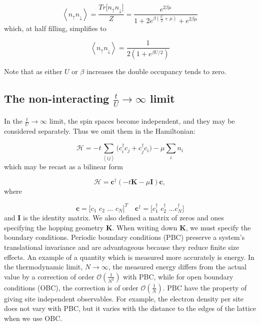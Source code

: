 \documentclass[10pt, twocolumn, twoside]{article}
\begin{document}
\begin{enumerate}
\begin{equation}
\left\langle n_\uparrow n_\downarrow \right\rangle = \frac{Tr \big[ n_\uparrow n_\downarrow \big]}{Z} = \frac{e^{2\beta\mu}}{1 + 2 e^{\beta (\frac{U}{2} + \mu )} + e^{2\beta\mu}}
\end{equation}
which, at half filling, simplifies to

\begin{equation}
\left\langle n_\uparrow n_\downarrow \right\rangle = \frac{1}{2 ( 1 + e^{\beta U/2} )}
\end{equation}

Note that as either $U$ or $\beta$ increases the double occupancy tends to zero.
\end{enumerate}

\subsection{The non-interacting $\frac{t}{U} \rightarrow \infty$ limit}\paragraph{}

In the $\frac{t}{U} \rightarrow \infty$ limit, the spin spaces become independent, and they may be considered separately. Thus we omit them in the Hamiltonian:

\begin{equation}
\mathcal{H} = -t \sum_{\left\langle i j \right\rangle} \big( c_i^\dagger c_j + c_j^\dagger c_i \big) - \mu \sum_i n_i
\end{equation}
which may be recast as a bilinear form

\begin{equation}
\mathcal{H} = \bm c^\dagger ( -t \bm K - \mu \bm I ) \bm c ,
\end{equation}
where

\begin{equation}
\bm c = \bigg[ c_1 \,\, c_2 \,\, ... \,\, c_N \bigg]^T \quad \bm c^\dagger = \bigg[c_1^\dagger \,\, c_2^\dagger \,\, ... c_N^\dagger \bigg]
\end{equation}
and $\bm I$ is the identity matrix. We also defined a matrix of zeros and ones specifying the hopping geometry $\bm K$. When writing down $\bm K$, we must specify the boundary conditions. Periodic boundary conditions (PBC) preserve a system's translational invariance and are advantageous because they reduce finite size effects. An example of a quantity which is measured more accurately is energy. In the thermodynamic limit, $N \rightarrow \infty$, the measured energy differs from the actual value by a correction of order $\mathcal{O}(\frac{1}{N^2})$ with PBC, while for open boundary conditions (OBC), the correction is of order $\mathcal{O}(\frac{1}{N})$. PBC have the property of giving site independent observables. For example, the electron density per site does not vary with PBC, but it varies with the distance to the edges of the lattice when we use OBC.
\end{document}

